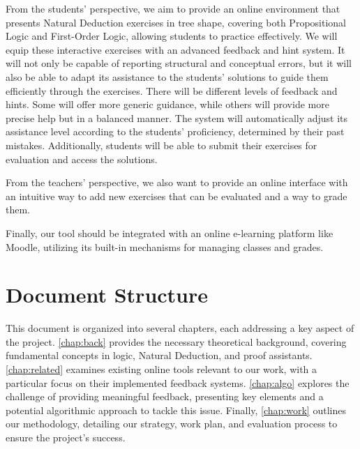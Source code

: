 From the students' perspective, we aim to provide an online environment that presents Natural Deduction exercises in tree shape, covering both Propositional Logic and First-Order Logic, allowing students to practice effectively. We will equip these interactive exercises with an advanced feedback and hint system. It will not only be capable of reporting structural and conceptual errors, but it will also be able to adapt its assistance to the students' solutions to guide them efficiently through the exercises. There will be different levels of feedback and hints. Some will offer more generic guidance, while others will provide more precise help but in a balanced manner. The system will automatically adjust its assistance level according to the students' proficiency, determined by their past mistakes. Additionally, students will be able to submit their exercises for evaluation and access the solutions.

From the teachers' perspective, we also want to provide an online interface with an intuitive way to add new exercises that can be evaluated and a way to grade them.

Finally, our tool should be integrated with an online e-learning platform like Moodle, utilizing its built-in mechanisms for managing classes and grades.

\section{Document Structure}

This document is organized into several chapters, each addressing a key aspect of the project. \autoref{chap:back} provides the necessary theoretical background, covering fundamental concepts in logic, Natural Deduction, and proof assistants. \autoref{chap:related} examines existing online tools relevant to our work, with a particular focus on their implemented feedback systems. \autoref{chap:algo} explores the challenge of providing meaningful feedback, presenting key elements and a potential algorithmic approach to tackle this issue. Finally, \autoref{chap:work} outlines our methodology, detailing our strategy, work plan, and evaluation process to ensure the project's success.

\endgroup
